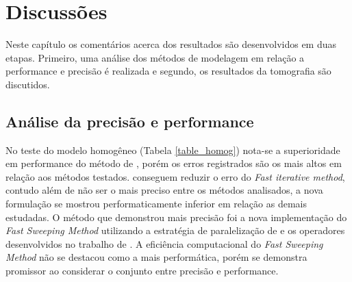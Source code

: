 \chapter{Discussões}
\label{ch:discussoes}

 
Neste capítulo os comentários acerca dos resultados são desenvolvidos em duas etapas. Primeiro, uma análise dos métodos de modelagem em relação a performance e precisão é realizada e segundo, os resultados da tomografia são discutidos.   
 
\section{Análise da precisão e performance} 

No teste do modelo homogêneo (Tabela \ref{table_homog}) nota-se a superioridade em performance do método de , porém os erros registrados são os mais altos em relação aos métodos testados.  conseguem reduzir o erro do \textit{Fast iterative method}, contudo além de não ser o mais preciso entre os métodos analisados, a nova formulação se mostrou performaticamente inferior em relação as demais estudadas. O método que demonstrou mais precisão foi a nova implementação do \textit{Fast Sweeping Method} utilizando a estratégia de paralelização de  e os operadores desenvolvidos no trabalho de . A eficiência computacional do \textit{Fast Sweeping Method} não se destacou como a mais performática, porém se demonstra promissor ao considerar o conjunto entre precisão e performance. 

